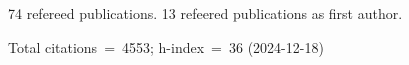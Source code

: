 74 refereed publications. 13 refeered publications as first author.

Total citations~=~4553; h-index~=~36 (2024-12-18)